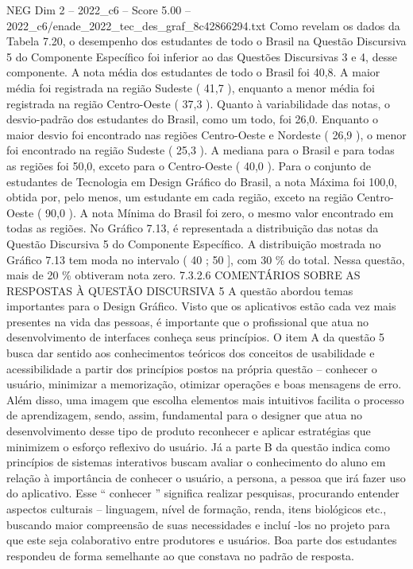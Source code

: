 \begin{textsample}{NEG Dim 2 – 2022\_c6 – Score 5.00 – 2022\_c6/enade\_2022\_tec\_des\_graf\_8c42866294.txt}
Como revelam os dados da Tabela 7.20, o desempenho dos estudantes de todo o Brasil na Questão Discursiva 5 do Componente Específico foi inferior ao das Questões Discursivas 3 e 4, desse componente.
A nota média dos estudantes de todo o Brasil foi 40,8.
A maior média foi registrada na região Sudeste ( 41,7 ), enquanto a menor média foi registrada na região Centro-Oeste ( 37,3 ).
Quanto à variabilidade das notas, o desvio-padrão dos estudantes do Brasil, como um todo, foi 26,0.
Enquanto o maior desvio foi encontrado nas regiões Centro-Oeste e Nordeste ( 26,9 ), o menor foi encontrado na região Sudeste ( 25,3 ).
A mediana para o Brasil e para todas as regiões foi 50,0, exceto para o Centro-Oeste ( 40,0 ).
Para o conjunto de estudantes de Tecnologia em Design Gráfico do Brasil, a nota Máxima foi 100,0, obtida por, pelo menos, um estudante em cada região, exceto na região Centro-Oeste ( 90,0 ).
A nota Mínima do Brasil foi zero, o mesmo valor encontrado em todas as regiões.
No Gráfico 7.13, é representada a distribuição das notas da Questão Discursiva 5 do Componente Específico.
A distribuição mostrada no Gráfico 7.13 tem moda no intervalo ( 40 ; 50 ], com 30 \% do total.
Nessa questão, mais de 20 \% obtiveram nota zero. 7.3.2.6 COMENTÁRIOS SOBRE AS RESPOSTAS À QUESTÃO DISCURSIVA 5 A questão abordou temas importantes para o Design Gráfico.
Visto que os aplicativos estão cada vez mais presentes na vida das pessoas, é importante que o profissional que atua no desenvolvimento de interfaces conheça seus princípios.
O item A da questão 5 busca dar sentido aos conhecimentos teóricos dos conceitos de usabilidade e acessibilidade a partir dos princípios postos na própria questão – conhecer o usuário, minimizar a memorização, otimizar operações e boas mensagens de erro.
Além disso, uma imagem que escolha elementos mais intuitivos facilita o processo de aprendizagem, sendo, assim, fundamental para o designer que atua no desenvolvimento desse tipo de produto reconhecer e aplicar estratégias que minimizem o esforço reflexivo do usuário.
Já a parte B da questão indica como princípios de sistemas interativos buscam avaliar o conhecimento do aluno em relação à importância de conhecer o usuário, a persona, a pessoa que irá fazer uso do aplicativo.
Esse “ conhecer ” significa realizar pesquisas, procurando entender aspectos culturais – linguagem, nível de formação, renda, itens biológicos etc., buscando maior compreensão de suas necessidades e incluí -los no projeto para que este seja colaborativo entre produtores e usuários.
Boa parte dos estudantes respondeu de forma semelhante ao que constava no padrão de resposta.

\end{textsample}
